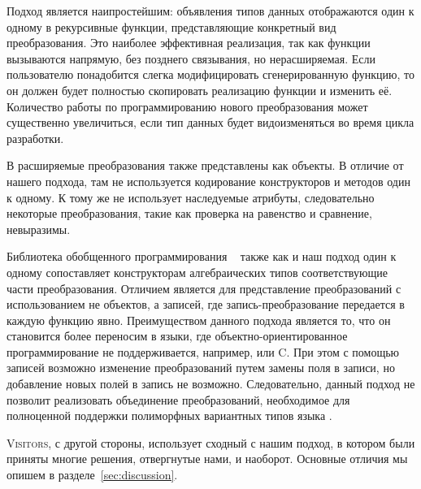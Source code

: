 Подход  является наипростейшим: объявления типов данных отображаются один к одному в рекурсивные функции, представляющие конкретный вид преобразования. Это наиболее эффективная реализация, так как функции вызываются напрямую, без позднего связывания, но нерасширяемая. Если пользователю понадобится слегка модифицировать сгенерированную функцию, то он должен будет полностью скопировать реализацию функции и изменить её. Количество работы по программированию нового преобразования может существенно увеличиться, если тип данных будет видоизменяться во время цикла разработки.

В  расширяемые преобразования также представлены как объекты. В отличие от нашего подхода, там не используется кодирование конструкторов и методов один к одному. К тому же  не использует наследуемые атрибуты, следовательно некоторые преобразования, такие как проверка на равенство и сравнение, невыразимы.

Библиотека обобщенного программирования  ~\cite{derivingMorphism} также как и наш подход один к одному сопоставляет конструкторам алгебраических типов соответствующие части преобразования. Отличием является для представление преобразований с использованием не объектов, а записей, где запись-преобразование передается в каждую функцию явно. Преимуществом данного подхода является то, что он становится более переносим в языки, где объектно-ориентированное программирование не поддерживается, например, 
\haskell{} или \textsc{C}. При этом с помощью записей возможно изменение преобразований путем замены поля в записи, но добавление новых полей в запись не возможно. Следовательно, данный подход не позволит реализовать объединение преобразований, необходимое для полноценной поддержки полиморфных вариантных типов языка \OCaml{}.

\textsc{Visitors}, с другой стороны, использует сходный с нашим подход, в котором были приняты многие решения, отвергнутые нами, и наоборот. Основные отличия мы опишем в разделе~\ref{sec:discussion}.

